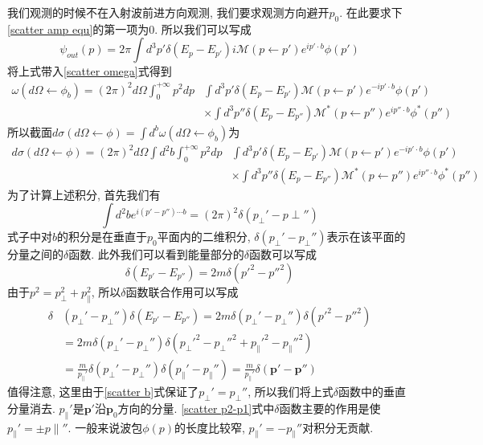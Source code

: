 \documentclass[a4paper,11pt]{book}
\begin{document}
我们观测的时候不在入射波前进方向观测, 我们要求观测方向避开$p_0$. 在此要求下\eqref{scatter amp equ}的第一项为$0$. 所以我们可以写成
\begin{equation}
  \psi_{out}(p)=2\pi\int d^3p'\delta(E_p-E_{p'})i\mathcal{M}(p\leftarrow p')e^{ip'\cdot b}\phi(p')
\end{equation}
将上式带入\eqref{scatter omega}式得到
\begin{equation}
  \begin{split}
     \omega(d\Omega\leftarrow\phi_b)=(2\pi)^2d\Omega\int_{0}^{+\infty}p^2dp&\int d^3p'\delta(E_p-E_{p'})\mathcal{M}(p\leftarrow p')e^{-ip'\cdot b}\phi(p')\\
       &\times\int d^3p''\delta(E_p-E_{p''})\mathcal{M}^*(p\leftarrow p'')e^{ip''\cdot b}\phi^*(p'')
  \end{split}
\end{equation}
所以截面$d\sigma(d\Omega\leftarrow\phi)=\int d^b\omega(d\Omega\leftarrow\phi_b)$为
\begin{equation}\label{scatter D}
  \begin{split}
     d\sigma(d\Omega\leftarrow\phi)=(2\pi)^2d\Omega\int d^2b\int_{0}^{+\infty}p^2dp&\int d^3p'\delta(E_p-E_{p'})\mathcal{M}(p\leftarrow p')e^{-ip'\cdot b}\phi(p')\\
       &\times\int d^3p''\delta(E_p-E_{p''})\mathcal{M}^*(p\leftarrow p'')e^{ip''\cdot b}\phi^*(p'')
  \end{split}
\end{equation}
为了计算上述积分, 首先我们有
\begin{equation}\label{scatter b}
  \int d^2b e^{i(p'-p'')\cdots b}=(2\pi)^2\delta(p_\perp'-p\perp'')
\end{equation}
式子中对$b$的积分是在垂直于$p_0$平面内的二维积分, $\delta(p_\perp'-p_\perp'')$表示在该平面的分量之间的$\delta$函数. 此外我们可以看到能量部分的$\delta$函数可以写成
\begin{equation}\label{scatter p2-p1}
  \delta(E_{p'}-E_{p''})=2m\delta(p'^2-p''^2)
\end{equation}
由于$p^2=p_\perp^2+p_\parallel^2$, 所以$\delta$函数联合作用可以写成
\begin{equation}
  \begin{split}
     \delta&(p_\perp'-p_\perp'')\delta(E_{p'}-E_{p''})=2m\delta(p_\perp'-p_\perp'')\delta(p'^2-p''^2)\\
       &=2m\delta(p_\perp'-p_\perp'')\delta(p_\perp'^2-p_\perp''^2+p_\parallel'^2-p_\parallel''^2)\\
       &=\frac{m}{p_\parallel'}\delta(p_\perp'-p_\perp'')\delta(p_\parallel'-p_\parallel'')=\frac{m}{p_\parallel'}\delta(\mathbf{p'}-\mathbf{p''})
  \end{split}
\end{equation}
值得注意, 这里由于\eqref{scatter b}式保证了$p_\perp'=p_\perp''$, 所以我们将上式$\delta$函数中的垂直分量消去. $p_\parallel'$是$\mathbf{p'}$沿$\mathbf{p}_0$方向的分量. \eqref{scatter p2-p1}式中$\delta$函数主要的作用是使$p_\parallel'=\pm p\parallel''$. 一般来说波包$\phi(p)$的长度比较窄, $p_\parallel'=-p_\parallel''$对积分无贡献.
\end{document}
